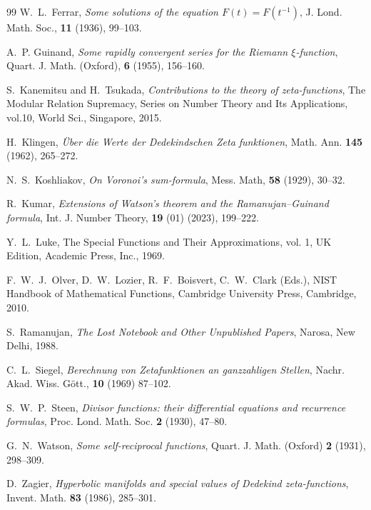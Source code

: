 \documentclass[12pt,reqno]{amsart}
\renewcommand{\(}{\left\(}
\renewcommand{\)}{\right\)}
\renewcommand{\[}{\left\[}
\renewcommand{\]}{\right\]}
\numberwithin{equation}{section}
\theoremstyle{plain}
\begin{document}
\begin{thebibliography}{99}
W.~L.~Ferrar, \emph{Some solutions of the equation $F(t) = F(t^{-1})$}, J. Lond. Math. Soc., {\bf 11} (1936), 99--103.

A.~P. Guinand, \emph{Some rapidly convergent series for the Riemann $\xi$-function}, Quart. J. Math. (Oxford), {\bf 6} (1955), 156--160.



S.~Kanemitsu and H.~Tsukada,  \emph{Contributions to the theory of zeta-functions},  The Modular Relation Supremacy, Series on Number Theory and Its Applications, vol.10, World Sci., Singapore, 2015.

H.~Klingen, \emph{\"{U}ber die Werte der Dedekindschen Zeta funktionen}, Math. Ann. \textbf{145} (1962), 265--272.

N.~S.~Koshliakov, \emph{On Voronoi’s sum-formula}, Mess. Math, {\bf 58} (1929), 30--32.

R.~Kumar, \emph{Extensions of Watson’s theorem and the Ramanujan–Guinand formula}, Int. J. Number Theory, {\bf 19} (01) (2023), 199--222.

Y.~L.~Luke, The Special Functions and Their Approximations, vol. 1, UK Edition, Academic Press, Inc., 1969.

F.~W.~J.~Olver, D.~W.~Lozier, R.~F.~Boisvert, C.~W.~Clark (Eds.), NIST Handbook of Mathematical Functions, Cambridge University Press, Cambridge, 2010.

S.~Ramanujan, \emph{The Lost Notebook and Other Unpublished Papers}, Narosa, New Delhi, 1988.

C.~L.~Siegel, \emph{Berechnung von Zetafunktionen an ganzzahligen Stellen}, Nachr. Akad. Wiss. G\"{o}tt., \textbf{10}  (1969) 87--102.


S.~W.~P.~Steen, \emph{Divisor functions: their differential equations and recurrence formulas}, Proc. Lond. Math. Soc. {\bf 2} (1930), 47--80.

G.~N.~Watson, \emph{Some self-reciprocal functions}, Quart. J. Math. (Oxford) {\bf 2} (1931), 298--309.

D.~Zagier, \emph{Hyperbolic manifolds and special values of Dedekind zeta-functions}, Invent. Math. {\bf 83} (1986), 285--301.
\end{thebibliography}
\end{document}
